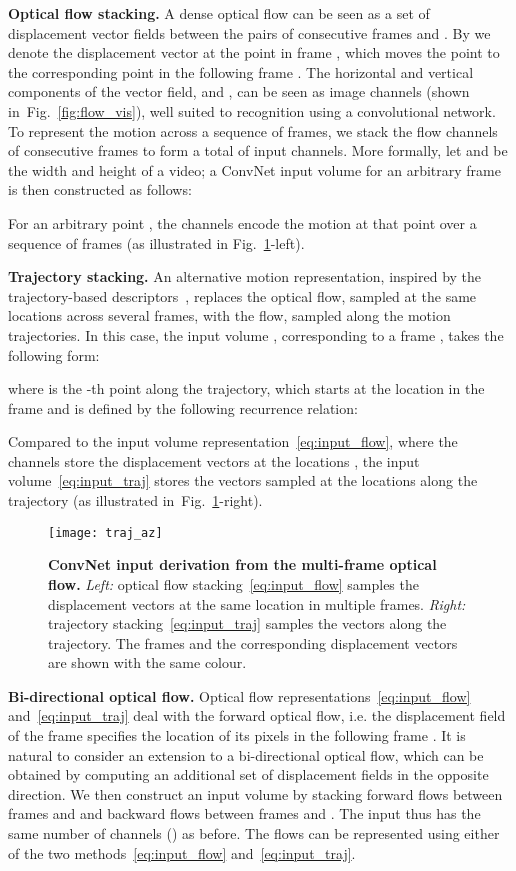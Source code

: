 \documentclass{article} \usepackage{nips14submit_e,times}
\makeatletter
\newcommand{\figref}[1]{Fig.~\ref{#1}}
\newcommand*{\ie}{i.e.\@\xspace}
\makeatother
\begin{document}
\noindent\textbf{Optical flow stacking.}
A dense optical flow can be seen as a set of displacement vector fields  between the pairs of consecutive frames  and . 
By  we denote the displacement vector at the point  in frame , which moves the point to the corresponding point in the following frame . 
The horizontal and vertical components of the vector field,  and ,  can be seen as image channels (shown in~\figref{fig:flow_vis}), well suited to
recognition using a convolutional network. 
To represent the motion across a sequence of frames, we stack the flow channels  of  consecutive frames to form a total of  input channels. 
More formally, let  and  be the width and height of a video;
a ConvNet input volume  for an arbitrary frame  is then constructed as follows:

For an arbitrary point , the channels  encode the motion at that point over a sequence of  frames (as illustrated in \figref{fig:traj}-left).

\noindent\textbf{Trajectory stacking.}
An alternative motion representation, inspired by the trajectory-based descriptors~\cite{Wang11b}, replaces the optical flow, sampled at the same locations across several frames,
with the flow, sampled along the motion trajectories. In this case, the input volume , corresponding to a frame , takes the following form:

where  is the -th point along the trajectory, which starts at the location  in the frame  and is defined by the following recurrence relation:

Compared to the input volume representation~\eqref{eq:input_flow},
where the channels  store the displacement vectors at
the locations , the input volume~\eqref{eq:input_traj} stores
the vectors sampled at the locations  along the trajectory
(as illustrated in~\figref{fig:traj}-right).


\begin{figure}[ht]
\centering
\texttt{[image: traj\_az]}
\caption{\textbf{ConvNet input derivation from the multi-frame optical flow.}
\emph{Left:} optical flow stacking~\eqref{eq:input_flow} samples the displacement vectors  at the same location in multiple frames.
\emph{Right:} trajectory stacking~\eqref{eq:input_traj} samples the vectors along the trajectory. The frames and the
corresponding displacement vectors are shown with the same colour.
}
\label{fig:traj}
\end{figure}


\noindent\textbf{Bi-directional optical flow.}
Optical flow representations~\eqref{eq:input_flow} and~\eqref{eq:input_traj} deal with the forward optical flow, \ie the displacement field  of the frame  specifies the location of its pixels
in the following frame . It is natural to consider an extension to a bi-directional optical flow, which can be obtained by computing an additional set of displacement fields in the opposite direction.
We then construct an input volume  by stacking  forward flows between frames  and  and  backward flows between frames  and . The input  
thus has the same number of channels () as before. The flows can be represented using either of the two methods~\eqref{eq:input_flow} and~\eqref{eq:input_traj}.
\end{document}
